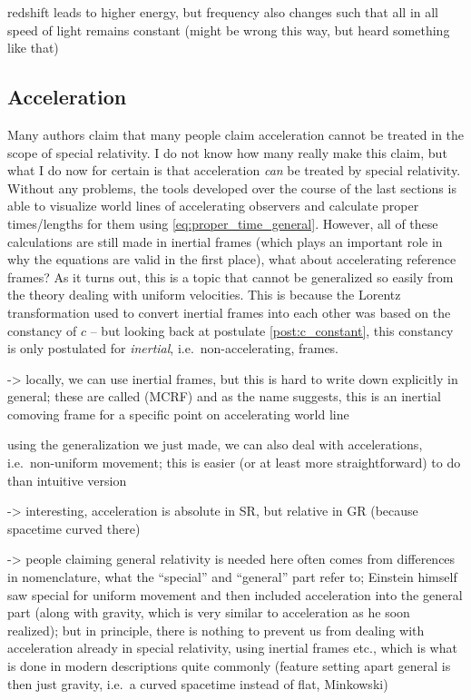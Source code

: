 redshift leads to higher energy, but frequency also changes such that all in all speed of light remains constant (might be wrong this way, but heard something like that)




		\subsection{Acceleration}%
Many authors claim that many people claim acceleration cannot be treated in the scope of special relativity. I do not know how many really make this claim, but what I do now for certain is that acceleration \emph{can} be treated by special relativity. Without any problems, the tools developed over the course of the last sections is able to visualize world lines of accelerating observers and calculate proper times/lengths for them using \eqref{eq:proper_time_general}. However, all of these calculations are still made in inertial frames (which plays an important role in why the equations are valid in the first place), what about accelerating reference frames? As it turns out, this is a topic that cannot be generalized so easily from the theory dealing with uniform velocities. This is because the Lorentz transformation used to convert inertial frames into each other was based on the constancy of $c$ -- but looking back at postulate \ref{post:c_constant}, this constancy is only postulated for \emph{inertial}, i.e.~non-accelerating, frames.

-> locally, we can use inertial frames, but this is hard to write down explicitly in general; these are called  (MCRF) and as the name suggests, this is an inertial comoving frame for a specific point on accelerating world line


using the generalization we just made, we can also deal with accelerations, i.e.~non-uniform movement; this is easier (or at least more straightforward) to do than intuitive version

-> interesting, acceleration is absolute in SR, but relative in GR (because spacetime curved there)


-> people claiming general relativity is needed here often comes from differences in nomenclature, what the \enquote{special} and \enquote{general} part refer to; Einstein himself saw special for uniform movement and then included acceleration into the general part (along with gravity, which is very similar to acceleration as he soon realized); but in principle, there is nothing to prevent us from dealing with acceleration already in special relativity, using inertial frames etc., which is what is done in modern descriptions quite commonly (feature setting apart general is then just gravity, i.e.~a curved spacetime instead of flat, Minkowski)



